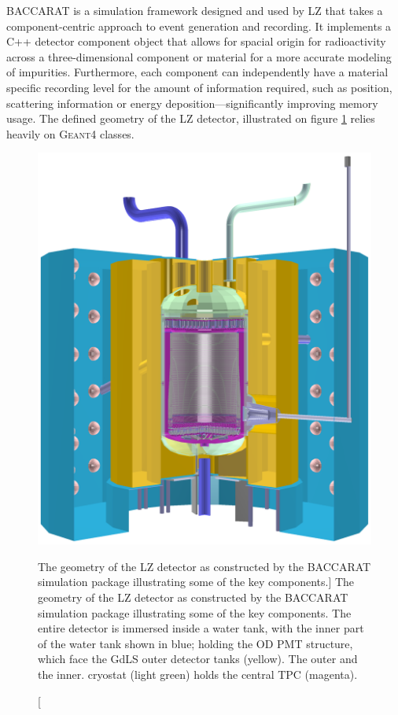 \textsc{BACCARAT} is a simulation framework designed and used by LZ that takes a component-centric approach to event generation and recording. It implements a C++ detector component object that allows for spacial origin for radioactivity across a three-dimensional component or material for a more accurate modeling of impurities. Furthermore, each component can independently have a material specific recording level for the amount of information required, such as position, scattering information or energy deposition---significantly improving memory usage. The defined geometry of the LZ detector, illustrated on figure \ref{fig:lz_geometry_viz} relies heavily on \textsc{Geant4} classes.

%
\begin{figure}[b]
    \centering
    \includegraphics[scale=0.21]{Chapter_5/Figures/lz_geometry_viz.png}
    \caption
    [The geometry of the LZ detector as constructed by the \textsc{BACCARAT} simulation package illustrating some of the key components.]
    {The geometry of the LZ detector as constructed by the \textsc{BACCARAT} simulation package illustrating some of the key components. The entire detector is immersed inside a water tank, with the inner part of the water tank shown in blue; holding the OD PMT structure, which face the GdLS outer detector tanks (yellow). The outer and the inner. cryostat (light green) holds the central TPC (magenta).}
    \label{fig:lz_geometry_viz}
\end{figure}
%


